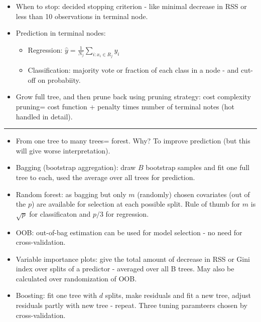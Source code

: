 \documentclass[]{article}
\providecommand{\tightlist}{%
  \setlength{\itemsep}{0pt}\setlength{\parskip}{0pt}}
\begin{document}
\begin{itemize}
\tightlist
\item
  When to stop: decided stopping criterion - like minimal decrease in
  RSS or less than 10 observations in terminal node.
\item
  Prediction in terminal nodes:

  \begin{itemize}
  \tightlist
  \item
    Regression: \(\hat{y}=\frac{1}{N_j}\sum_{i: x_i \in R_j} y_i\)
  \item
    Classification: majority vote or fraction of each class in a node -
    and cut-off on probabiity.
  \end{itemize}
\item
  Grow full tree, and then prune back using pruning strategy: cost
  complexity pruning= cost function + penalty times number of terminal
  notes (hot handled in detail).
\end{itemize}

\begin{center}\rule{0.5\linewidth}{\linethickness}\end{center}

\begin{itemize}
\tightlist
\item
  From one tree to many trees= forest. Why? To improve prediction (but
  this will give worse interpretation).
\item
  Bagging (bootstrap aggregation): draw \(B\) bootstrap samples and fit
  one full tree to each, used the average over all trees for prediction.
\item
  Random forest: as bagging but only \(m\) (randomly) chosen covariates
  (out of the \(p\)) are available for selection at each possible split.
  Rule of thumb for \(m\) is \(\sqrt{p}\) for classificaton and \(p/3\)
  for regression.
\item
  OOB: out-of-bag estimation can be used for model selection - no need
  for cross-validation.
\item
  Variable importance plots: give the total amount of decrease in RSS or
  Gini index over splits of a predictor - averaged over all B trees. May
  also be calculated over randomization of OOB.
\item
  Boosting: fit one tree with \(d\) splits, make residuals and fit a new
  tree, adjust residuals partly with new tree - repeat. Three tuning
  paramteers chosen by cross-validation.
\end{itemize}
\end{document}
